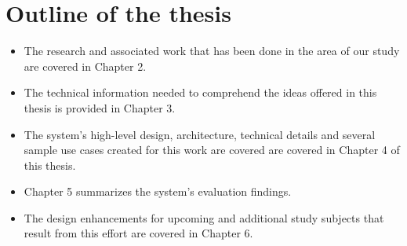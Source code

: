 \section{Outline of the thesis}
\begin{itemize}
    \item The research and associated work that has been done in the area of our study are covered in Chapter 2.
    
\vspace{.5cm}

    \item The technical information needed to comprehend the ideas offered in this thesis is provided in Chapter 3.
    
\vspace{.5cm}

    \item The system's high-level design, architecture, technical details and several sample use cases created for this work are covered  are covered in Chapter 4 of this thesis.
    
\vspace{.5cm}

    \item Chapter 5 summarizes the system's evaluation findings.
    
\vspace{.5cm}

    \item The design enhancements for upcoming and additional study subjects that result from this effort are covered in Chapter 6.
\end{itemize}


